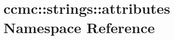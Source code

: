 \hypertarget{namespaceccmc_1_1strings_1_1attributes}{\section{ccmc\-:\-:strings\-:\-:attributes Namespace Reference}
\label{namespaceccmc_1_1strings_1_1attributes}
}
